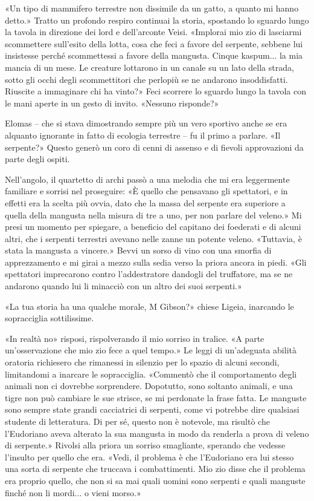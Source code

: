 «Un tipo di mammifero terrestre non dissimile da un gatto, a quanto mi
hanno detto.» Tratto un profondo respiro continuai la storia, spostando
lo sguardo lungo la tavola in direzione dei lord e dell'arconte Veisi.
«Implorai mio zio di lasciarmi scommettere sull'esito della lotta, cosa
che feci a favore del serpente, sebbene lui insistesse perché
scommettessi a favore della mangusta. Cinque kaspum... la mia mancia di
un mese. Le creature lottarono in un canale su un lato della strada,
sotto gli occhi degli scommettitori che perlopiù se ne andarono
insoddisfatti. Riuscite a immaginare chi ha vinto?» Feci scorrere lo
sguardo lungo la tavola con le mani aperte in un gesto di invito.
«Nessuno risponde?»

Elomas -- che si stava dimostrando sempre più un vero sportivo anche se
era alquanto ignorante in fatto di ecologia terrestre -- fu il primo a
parlare. «Il serpente?» Questo generò un coro di cenni di assenso e di
fievoli approvazioni da parte degli ospiti.

Nell'angolo, il quartetto di archi passò a una melodia che mi era
leggermente familiare e sorrisi nel proseguire: «È quello che pensavano
gli spettatori, e in effetti era la scelta più ovvia, dato che la massa
del serpente era superiore a quella della mangusta nella misura di tre a
uno, per non parlare del veleno.» Mi presi un momento per spiegare, a
beneficio del capitano dei foederati e di alcuni altri, che i serpenti
terrestri avevano nelle zanne un potente veleno. «Tuttavia, è stata la
mangusta a vincere.» Bevvi un sorso di vino con una smorfia di
apprezzamento e mi girai a mezzo sulla sedia verso la priora ancora in
piedi. «Gli spettatori imprecarono contro l'addestratore dandogli del
truffatore, ma se ne andarono quando lui li minacciò con un altro dei
suoi serpenti.»

«La tua storia ha una qualche morale, M Gibson?» chiese Ligeia,
inarcando le sopracciglia sottilissime.

«In realtà no» risposi, rispolverando il mio sorriso in tralice. «A
parte un'osservazione che mio zio fece a quel tempo.» Le leggi di
un'adeguata abilità oratoria richiesero che rimanessi in silenzio per lo
spazio di alcuni secondi, limitandomi a inarcare le sopracciglia.
«Commentò che il comportamento degli animali non ci dovrebbe
sorprendere. Dopotutto, sono soltanto animali, e una tigre non può
cambiare le sue strisce, se mi perdonate la frase fatta. Le manguste
sono sempre state grandi cacciatrici di serpenti, come vi potrebbe dire
qualsiasi studente di letteratura. Di per sé, questo non è notevole, ma
risultò che l'Eudoriano aveva alterato la sua mangusta in modo da
renderla a prova di veleno di serpente.» Rivolsi alla priora un sorriso
smagliante, sperando che vedesse l'insulto per quello che era. «Vedi, il
problema è che l'Eudoriano era lui stesso una sorta di serpente che
truccava i combattimenti. Mio zio disse che il problema era proprio
quello, che non si sa mai quali uomini sono serpenti e quali manguste
finché non li mordi... o vieni morso.»

